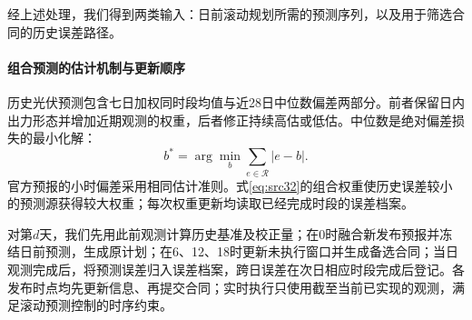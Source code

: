经上述处理，我们得到两类输入：日前滚动规划所需的预测序列，以及用于筛选合同的历史误差路径。



\paragraph{组合预测的估计机制与更新顺序}
历史光伏预测包含七日加权同时段均值与近28日中位数偏差两部分。前者保留日内出力形态并增加近期观测的权重，后者修正持续高估或低估。中位数是绝对偏差损失的最小化解：
\begin{equation}\label{eq:median_fit}
 b^* = \arg\min_b\sum_{e\in\mathcal R}|e-b|.
\end{equation}
官方预报的小时偏差采用相同估计准则。式\eqref{eq:src32}的组合权重使历史误差较小的预测源获得较大权重；每次权重更新均读取已经完成时段的误差档案。

对第$d$天，我们先用此前观测计算历史基准及校正量；在0时融合新发布预报并冻结日前预测，生成原计划；在6、12、18时更新未执行窗口并生成备选合同；当日观测完成后，将预测误差归入误差档案，跨日误差在次日相应时段完成后登记。各发布时点均先更新信息、再提交合同；实时执行只使用截至当前已实现的观测，满足滚动预测控制的时序约束\cite{parisio2014mpc}。
